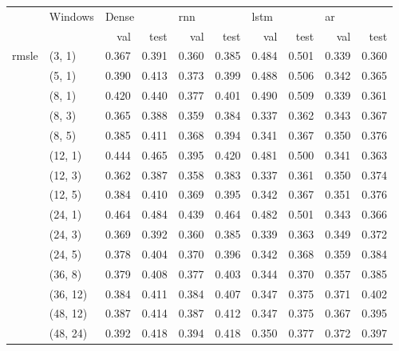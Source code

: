 \vspace{2em}

\begin{tabular}{ll|rr|rr|rr|rr}
\toprule
      &   Windows       & \multicolumn{2}{l}{Dense} & \multicolumn{2}{l}{\acrshort{rnn}} & \multicolumn{2}{l}{\acrshort{lstm}} & \multicolumn{2}{l}{\acrshort{ar}} \\*
      &          & val & test & val & test & val & test & val & test \\*
\midrule
\multirow{15}{*}{\acrshort{rmsle}} & (3, 1) &     0.367 &      0.391 &   0.360 &    0.385 &    0.484 &     0.501 &  0.339 &   0.360 \\*
      & (5, 1) &     0.390 &      0.413 &   0.373 &    0.399 &    0.488 &     0.506 &  0.342 &   0.365 \\*
      & (8, 1) &     0.420 &      0.440 &   0.377 &    0.401 &    0.490 &     0.509 &  0.339 &   0.361 \\*
      & (8, 3) &     0.365 &      0.388 &   0.359 &    0.384 &    0.337 &     0.362 &  0.343 &   0.367 \\*
      & (8, 5) &     0.385 &      0.411 &   0.368 &    0.394 &    0.341 &     0.367 &  0.350 &   0.376 \\*
      & (12, 1) &     0.444 &      0.465 &   0.395 &    0.420 &    0.481 &     0.500 &  0.341 &   0.363 \\*
      & (12, 3) &     0.362 &      0.387 &   0.358 &    0.383 &    0.337 &     0.361 &  0.350 &   0.374 \\*
      & (12, 5) &     0.384 &      0.410 &   0.369 &    0.395 &    0.342 &     0.367 &  0.351 &   0.376 \\*
      & (24, 1) &     0.464 &      0.484 &   0.439 &    0.464 &    0.482 &     0.501 &  0.343 &   0.366 \\*
      & (24, 3) &     0.369 &      0.392 &   0.360 &    0.385 &    0.339 &     0.363 &  0.349 &   0.372 \\*
      & (24, 5) &     0.378 &      0.404 &   0.370 &    0.396 &    0.342 &     0.368 &  0.359 &   0.384 \\*
      & (36, 8) &     0.379 &      0.408 &   0.377 &    0.403 &    0.344 &     0.370 &  0.357 &   0.385 \\*
      & (36, 12) &     0.384 &      0.411 &   0.384 &    0.407 &    0.347 &     0.375 &  0.371 &   0.402 \\*
      & (48, 12) &     0.387 &      0.414 &   0.387 &    0.412 &    0.347 &     0.375 &  0.367 &   0.395 \\*
      & (48, 24) &     0.392 &      0.418 &   0.394 &    0.418 &    0.350 &     0.377 &  0.372 &   0.397 \\*
\bottomrule
\end{tabular}

\vspace{2em}